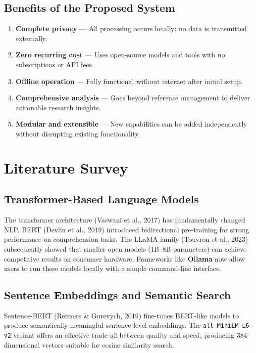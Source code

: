 \documentclass[12pt,a4paper]{article}
\begin{document}
\subsection{Benefits of the Proposed System}
\begin{enumerate}[leftmargin=2em]
    \item \textbf{Complete privacy} --- All processing occurs locally;
          no data is transmitted externally.
    \item \textbf{Zero recurring cost} --- Uses open-source models and
          tools with no subscriptions or API fees.
    \item \textbf{Offline operation} --- Fully functional without internet
          after initial setup.
    \item \textbf{Comprehensive analysis} --- Goes beyond reference
          management to deliver actionable research insights.
    \item \textbf{Modular and extensible} --- New capabilities can be
          added independently without disrupting existing functionality.
\end{enumerate}

\newpage

\section{Literature Survey}

\subsection{Transformer-Based Language Models}
The transformer architecture (Vaswani et al., 2017) has fundamentally
changed NLP.  BERT (Devlin et al., 2019) introduced bidirectional
pre-training for strong performance on comprehension tasks.  The LLaMA
family (Touvron et al., 2023) subsequently showed that smaller open models
(1B--8B parameters) can achieve competitive results on consumer hardware.
Frameworks like \textbf{Ollama} now allow users to run these models locally
with a simple command-line interface.

\subsection{Sentence Embeddings and Semantic Search}
Sentence-BERT (Reimers \& Gurevych, 2019) fine-tunes BERT-like models to
produce semantically meaningful sentence-level embeddings.  The
\texttt{all-MiniLM-L6-v2} variant offers an effective trade-off between
quality and speed, producing 384-dimensional vectors suitable for cosine
similarity search.
\end{document}
